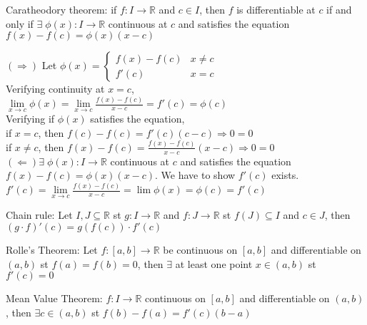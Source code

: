 \documentclass{article}
\begin{document}
Caratheodory theorem: if $f:I \rightarrow \mathbb{R}$  and $c \in I$, then $f$ is differentiable at $c$ if and only if $\exists \; \phi(x): I \rightarrow \mathbb{R}$ continuous at $c$ and satisfies the equation $f(x) - f(c) = \phi(x)(x-c)$
\begin{tcolorbox}[colback=lightgray!10,colframe=lightgray!10, fontupper=\linespread{1.5}\selectfont]
	$(\Rightarrow)$ Let $\phi(x) = \begin{cases} f(x) - f(c) & x \not= c \\ f'(c) & x = c \end{cases}$ \\	
	Verifying continuity at $x=c$, \\
	$\lim\limits_{x \rightarrow c} \phi(x) = \lim\limits_{x \rightarrow c} \frac{f(x) - f(c)}{x-c} = f'(c) = \phi(c)$ \\
	Verifying if $\phi(x)$ satisfies the equation, \\	
	if $x=c$, then $f(c) - f(c) = f'(c)(c-c) \Rightarrow 0=0$ \\	
	if $x\not=c$, then $f(x)-f(c) = \frac{f(x)-f(c)}{x-c}(x-c) \Rightarrow 0 = 0$ \\
	$(\Leftarrow) \exists \; \phi(x): I \rightarrow \mathbb{R}$ continuous at $c$ and satisfies the equation $f(x) - f(c) = \phi(x)(x-c)$. We have to show $f'(c)$ exists. \\
	$f'(c) = \lim\limits_{x \rightarrow c} \frac{f(x) - f(c)}{x-c} = \lim \phi(x) = \phi(c) = f'(c)$
\end{tcolorbox}

Chain rule: Let $I,J \subseteq \mathbb{R}$ st $g: I \rightarrow \mathbb{R}$ and $f: J \rightarrow \mathbb{R}$ st $f(J) \subseteq I$ and $c \in J$, then $(g\cdot f)'(c) = g(f(c)) \cdot f'(c)$

Rolle's Theorem: Let $f:[a,b] \rightarrow \mathbb{R}$ be continuous on $[a,b]$ and differentiable on $(a,b)$ st $f(a) = f(b) = 0$, then $\exists$ at least one point $x \in (a,b)$ st $f'(c) = 0$

Mean Value Theorem: $f: I \rightarrow \mathbb{R}$ continuous on $[a,b]$ and differentiable on $(a,b)$, then $\exists c \in (a,b)$ st $f(b) - f(a) = f'(c)(b-a)$
\end{document}
